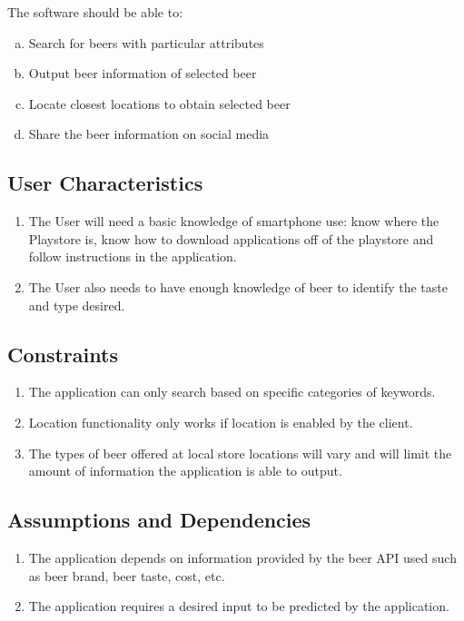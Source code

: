 \documentclass[]{article}
\begin{document}
The software should be able to:
\begin{enumerate}[a)]

\item Search for beers with particular attributes
\item Output beer information of selected beer
\item Locate closest locations to obtain selected beer
\item Share the beer information on social media 

	
\end{enumerate}

\subsection{User Characteristics}
\label{sub:user_characteristics}
\begin{enumerate}

	\item The User will need a basic knowledge of smartphone use: know where the Playstore is, know how to download applications off of the playstore and follow instructions in the application.
	\item The User also needs to have enough knowledge of beer to identify the taste and type desired.

\end{enumerate}

\subsection{Constraints}
\label{sub:constraints}
\begin{enumerate}

	\item The application can only search based on specific categories of keywords.
	\item Location functionality only works if location is enabled by the client.
	\item The types of beer offered at local store locations will vary and will limit the amount of information the application is able to output.
	
\end{enumerate}

\subsection{Assumptions and Dependencies}
\label{sub:assumptions_and_dependencies}
\begin{enumerate}

\item The application depends on information provided by the beer API used such as beer brand, beer taste, cost, etc.
\item The application requires a desired input to be predicted by the application.

\end{enumerate}
\end{document}
